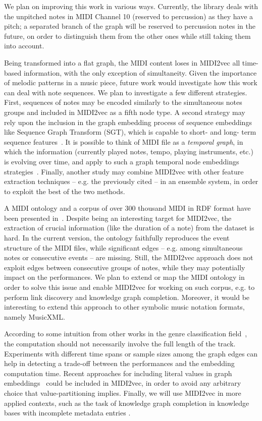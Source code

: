 \documentclass{article}
\begin{document}
We plan on improving this work in various ways. Currently, the library deals with the unpitched notes in MIDI Channel 10 (reserved to percussion) as they have a pitch; a separated branch of the graph will be reserved to percussion notes in the future, on order to distinguish them from the other ones while still taking them into account.

Being transformed into a flat graph, the MIDI content loses in MIDI2vec all time-based information, with the only exception of simultaneity. Given the importance of melodic patterns in a music piece, future work would investigate how this work can deal with note sequences. We plan to investigate a few different strategies.
First, sequences of notes may be encoded similarly to the simultaneous notes groups and included in MIDI2vec as a fifth node type.
A second strategy may rely upon the inclusion in the graph embedding process of sequence embeddings like Sequence Graph Transform (SGT), which is capable to short- and long- term sequence features~\citep{ranjan2016sequence}.
It is possible to think of MIDI file as a \textit{temporal graph}, in which the information (currently played notes, tempo, playing instruments, etc.) is evolving over time, and apply to such a graph temporal node embeddings strategies~\citep{singer2019temporalgraphs}.
Finally, another study may combine MIDI2vec with other feature extraction techniques -- e.g. the previously cited \cite{mckay2018} -- in an ensemble system, in order to exploit the best of the two methods.

A MIDI ontology and a corpus of over 300 thousand MIDI in RDF format have been presented in~\citep{merono2018semantic_midi}. Despite being an interesting target for MIDI2vec, the extraction of crucial information (like the duration of a note) from the dataset is hard. In the current version, the ontology faithfully reproduces the event structure of the MIDI files, while significant edges -- e.g. among simultaneous notes or consecutive events -- are missing. Still, the MIDI2vec approach does not exploit edges between consecutive groups of notes, while they may potentially impact on the performances. We plan to extend or map the MIDI ontology in order to solve this issue and enable MIDI2vec for working on such corpus, e.g. to perform link discovery and knowledge graph completion. Moreover, it would be interesting to extend this approach to other symbolic music notation formats, namely MusicXML.

According to some intuition from other works in the genre classification field~\citep{Cataltepe2007}, the computation should not necessarily involve the full length of the track. Experiments with different time spans or sample sizes among the graph edges can help in detecting a trade-off between the performances and the embedding computation time. Recent approaches for including literal values in graph embeddings~\citep{cochez2018literals, kristiadi2018literale} could be included in MIDI2vec, in order to avoid any arbitrary choice that value-partitioning implies. Finally, we will use MIDI2vec in more applied contexts, such as the task of knowledge graph completion in knowledge bases with incomplete metadata entries \citep{merono2017midi}.
\end{document}
